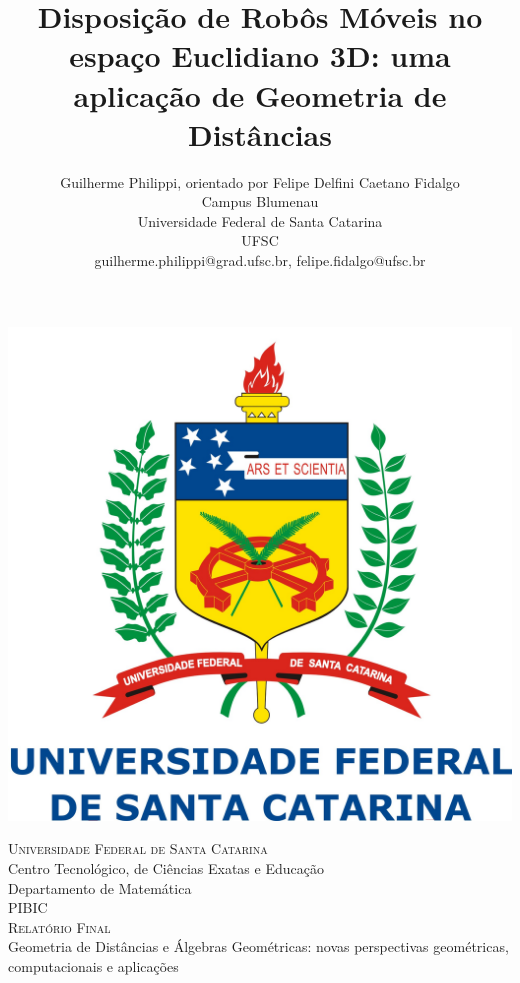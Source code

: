 \documentclass[a4paper,12pt]{report}
\title{Disposição de Robôs Móveis no espaço Euclidiano 3D: uma aplicação de Geometria de Distâncias}
\author{Guilherme Philippi\Mark{*}, orientado por Felipe Delfini Caetano Fidalgo\Mark{\dagger}\\Campus Blumenau\\Universidade Federal de Santa Catarina\\UFSC
	\\guilherme.philippi@grad.ufsc.br\Mark{*}, felipe.fidalgo@ufsc.br\Mark{\dagger}}
\begin{document}
	\begin{titlepage}
		\newcommand{\HRule}{\rule{\linewidth}{0.5mm}} %
		\center %
		\begin{center}
			\includegraphics[scale=0.22]{figures/logoufsc.jpg}
		\end{center}
		\vspace{1cm}
		
		\textsc{\LARGE \hspace{-0.17cm}Universidade Federal de Santa Catarina}\\[0.5cm] %
		{\Large Centro Tecnológico, de Ciências Exatas e Educação\\ Departamento de Matemática}\\[1.5cm] %
		\textsc{\Large PIBIC \\ Relatório Final \vspace{1.5cm}  \\ }{\large Geometria de Distâncias e Álgebras Geométricas: novas perspectivas geométricas, computacionais e aplicações}\\[2.0cm] %
		

\end{titlepage}
\end{document}
